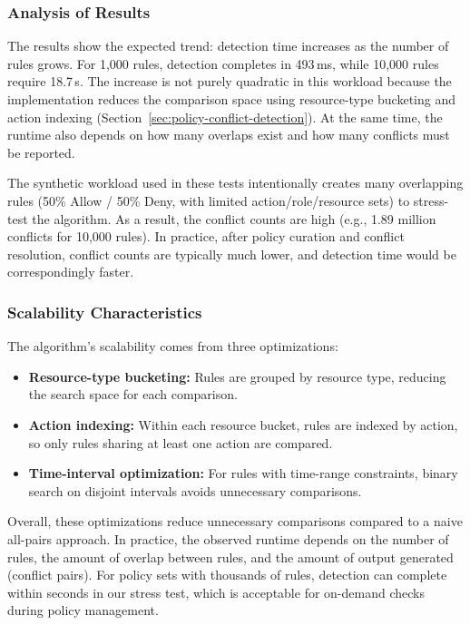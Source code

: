 \subsubsection{Analysis of Results}

The results show the expected trend: detection time increases as the number of rules grows. For 1,000 rules, detection completes in 493\,ms, while 10,000 rules require 18.7\,s. The increase is not purely quadratic in this workload because the implementation reduces the comparison space using resource-type bucketing and action indexing (Section~\ref{sec:policy-conflict-detection}). At the same time, the runtime also depends on how many overlaps exist and how many conflicts must be reported.


The synthetic workload used in these tests intentionally creates many overlapping rules (50\% Allow / 50\% Deny, with limited action/role/resource sets) to stress-test the algorithm. As a result, the conflict counts are high (e.g., 1.89 million conflicts for 10,000 rules). In practice, after policy curation and conflict resolution, conflict counts are typically much lower, and detection time would be correspondingly faster.

\subsubsection{Scalability Characteristics}

The algorithm's scalability comes from three optimizations:

\begin{itemize}
    \item \textbf{Resource-type bucketing:} Rules are grouped by resource type, reducing the search space for each comparison.
    \item \textbf{Action indexing:} Within each resource bucket, rules are indexed by action, so only rules sharing at least one action are compared.
    \item \textbf{Time-interval optimization:} For rules with time-range constraints, binary search on disjoint intervals avoids unnecessary comparisons.
\end{itemize}

Overall, these optimizations reduce unnecessary comparisons compared to a naive all-pairs approach. In practice, the observed runtime depends on the number of rules, the amount of overlap between rules, and the amount of output generated (conflict pairs). For policy sets with thousands of rules, detection can complete within seconds in our stress test, which is acceptable for on-demand checks during policy management.

